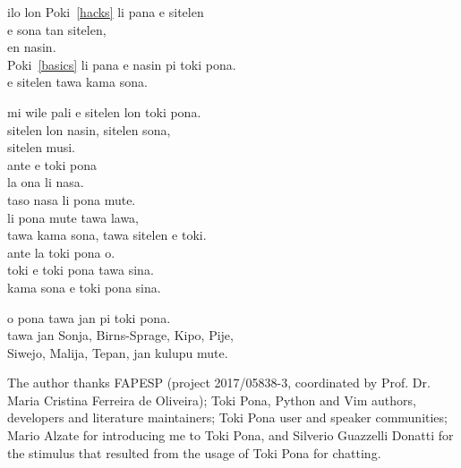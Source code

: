 ilo lon Poki~\ref{hacks} li pana e sitelen\\
e sona tan sitelen,\\
en nasin.\\
Poki~\ref{basics} li pana e nasin pi toki pona.\\
e sitelen tawa kama sona.

mi wile pali e sitelen lon toki pona.\\
sitelen lon nasin, sitelen sona,\\
sitelen musi.\\
ante e toki pona\\
la ona li nasa.\\
taso nasa li pona mute.\\
li pona mute tawa lawa,\\
tawa kama sona, tawa sitelen e toki.\\
ante la toki pona o.\\
toki e toki pona tawa sina.\\
kama sona e toki pona sina.

o pona tawa jan pi toki pona.\\
tawa jan Sonja, Birns-Sprage, Kipo, Pije,\\
Siwejo, Malija, Tepan, jan kulupu mute.

\begin{acks}

The author thanks
FAPESP (project 2017/05838-3, coordinated by Prof. Dr. Maria Cristina Ferreira de Oliveira);
Toki Pona, Python and Vim authors, developers and literature maintainers;
Toki Pona user and speaker communities; 
Mario Alzate for introducing me to Toki Pona,
and Silverio Guazzelli Donatti for the stimulus that resulted
from the usage of Toki Pona for chatting.

\end{acks}



